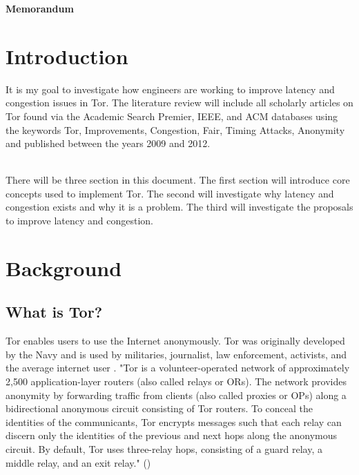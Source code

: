 \documentclass[letterpaper,13pt]{texMemo}
\begin{document}
\begin{center}
\large {\bf Memorandum}
\end{center}
\singlespace
\setlength{\topmargin}{0in}
\maketitle
\section*{Introduction}
\noindent
It is my goal to investigate how engineers are working to improve latency and congestion issues in
Tor. The literature review will include all scholarly articles on Tor found via the Academic Search
Premier, IEEE, and ACM databases using the keywords Tor, Improvements, Congestion, Fair, Timing
Attacks, Anonymity and published between the years 2009 and 2012.

\noindent
\\There will be three section in this document. The first section will introduce core concepts used to
implement Tor. The second will investigate why latency and congestion exists and why it is a
problem. The third will investigate the proposals to improve latency and congestion.

\section*{Background}

    \subsection*{What is Tor?}
    Tor enables users to use the Internet anonymously. Tor was originally developed by the Navy
    and is used by militaries, journalist, law enforcement, activists, and the average internet user
    \citep[2]{Tor:web}.
    "Tor is a volunteer-operated network of approximately 2,500 application-layer routers (also
    called relays or ORs). The network provides anonymity by forwarding traffic from clients (also
    called proxies or OPs) along a bidirectional anonymous circuit consisting of Tor routers. To
    conceal the identities of the communicants, Tor encrypts messages such that each relay can
    discern only the identities of the previous and next hops along the anonymous circuit. By
    default, Tor uses three-relay hops, consisting of a guard relay, a middle relay, and an exit
    relay." (\citeauthor[1]{Moore})
\end{document}
